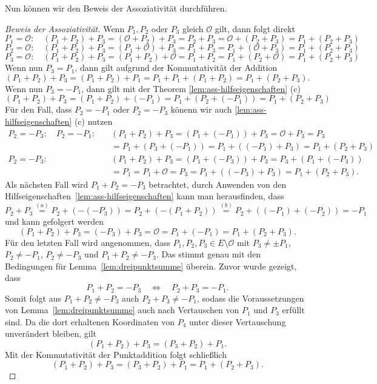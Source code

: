 Nun können wir den Beweis der Assoziativität durchführen.
\begin{proof}[Beweis der Assoziativität]
    Wenn $P_1,P_2$ oder $P_3$ gleich $\mathcal{O}$ gilt, dann folgt direkt
    \[
        P_1=\mathcal{O}: \quad (P_1+P_2)+P_3=(\mathcal{O}+P_2)+P_3=P_2+P_3 = \mathcal{O}+(P_2+P_3)=P_1+(P_2+P_3)
    \]
    \[
        P_2=\mathcal{O}: \quad (P_1+P_2)+P_3=(P_1+\mathcal{O})+P_3 =P_1+P_3 = P_1+(\mathcal{O}+P_3)=P_1+(P_2+P_3)
    \]
    \[
        P_3=\mathcal{O}: \quad (P_1+P_2)+P_3=(P_1+P_2)+\mathcal{O} =P_1+P_2 = P_1+(P_2+\mathcal{O})=P_1+(P_2+P_3)
    \]
    Wenn nun $P_3=P_1$, dann gilt aufgrund der Kommutativität der Addition
    \[
        (P_1+P_2)+P_3=(P_1+P_2)+P_1=P_1+P_1+(P_1+P_2)=P_1+(P_2+P_3).
    \]
    Wenn nun $P_3=-P_1$, dann gilt mit der Theorem \ref{lem:ass-hilfseigenschaften} (c)
    \[
        (P_1+P_2)+P_3 = (P_1+P_2)+(-P_1)=P_1+(P_2+(-P_1))=P_1+(P_2+P_3)
    \]
    Für den Fall, dass $P_2=-P_1$ oder $P_2=-P_3$ könenn wir auch \ref{lem:ass-hilfseigenschaften} (c) nutzen
    \begin{align*}
        P_2=-P_3:\quad
        P_2=-P_1:\quad & (P_1+P_2)+P_3
        = (P_1+(-P_1))+P_3=\mathcal{O}+P_3=P_3                                       \\
                       & = P_1+(P_3+(-P_1))=P_1+((-P_1)+P_3)=P_1+(P_2+P_3)           \\
        P_2=-P_3:\quad & (P_1+P_2)+P_3
        = (P_1+(-P_3))+P_3=P_3+(P_1+(-P_3))                                          \\
                       & = P_1 = P_1+\mathcal{O}=P_3=P_1+((-P_3)+P_3)=P_1+(P_2+P_3).
    \end{align*}
    Als nächsten Fall wird $P_1+P_2=-P_3$ betrachtet, durch Anwenden von den Hilfseigenschaften~\ref{lem:ass-hilfseigenschaften} kann man herausfinden, dass
    \[
        P_2+P_3\overset{(a)}{=}P_2+(-(-P_3))=P_2+(-(P_1+P_2))\overset{(b)}{=}P_2+((-P_1)+(-P_2))=-P_1
    \]
    und kann gefolgert werden
    \[
        (P_1+P_2)+P_3=(-P_3)+P_3=\mathcal{O}=P_1+(-P_1)=P_1+(P_2+P_3).
    \]
    Für den letzten Fall wird angenommen, dass $P_1,P_2,P_3\in E\setminus{\mathcal{O}}$ mit $P_3\neq\pm P_1$, $P_2\neq -P_1$, $P_2\neq-P_3$ und $P_1+P_2\neq-P_3$. Das stimmt genau mit den Bedingungen für Lemma~\ref{lem:dreipunktsumme} überein. Zuvor wurde gezeigt, dass
    \[
        P_1+P_2=-P_3
        \quad\Longleftrightarrow\quad
        P_2+P_3=-P_1.
    \]
    Somit folgt aus $P_1+P_2\neq-P_3$ auch
    $P_2+P_3\neq-P_1$, sodass die Voraussetzungen von
    Lemma~\ref{lem:dreipunktsumme} auch nach Vertauschen von
    $P_1$ und $P_3$ erfüllt sind.  Da die dort erhaltenen Koordinaten
    von $P_4$ unter dieser Vertauschung unverändert bleiben, gilt
    \[
        (P_1+P_2)+P_3=(P_3+P_2)+P_1.
    \]
    Mit der Kommutativität der Punktaddition folgt schließlich
    \[
        (P_1+P_2)+P_3
        =(P_3+P_2)+P_1
        =P_1+(P_2+P_3).
    \]
\end{proof}

